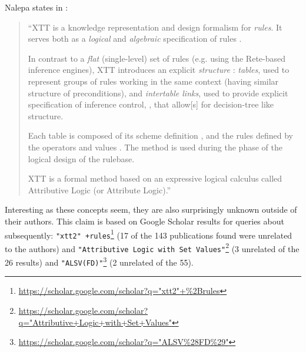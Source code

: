 Nalepa states in \cite{nalepa2008xtt2}:

\begin{quotation}
	``XTT is a knowledge representation and design formalism for \emph{rules}. It serves both as a \emph{logical} and \emph{algebraic} specification of rules \elide.
	
	In contrast to \elide a \emph{flat} (single-level) set of rules (e.g. using the Rete-based inference engines), XTT introduces an explicit \emph{structure} \elide: \emph{tables}, used to represent groups of rules working in the same context (having similar structure of preconditions), and \emph{intertable links}, used to provide explicit specification of inference control, \elide, that allow[s] for decision-tree like structure.
	
	Each table is composed of its scheme \elide definition \elide, and
	the rules defined by the operators and values \elide.
	The method is used during the phase of the logical design of the rulebase. \elide
	
	XTT is a formal method based on an expressive logical calculus called Attributive Logic (or Attribute Logic).''
\end{quotation}

Interesting as these concepts seem, they are also surprisingly unknown outside of their authors. This claim is based on Google Scholar results for queries about subsequently: \texttt{"xtt2"~+rules}\footnote{\url{https://scholar.google.com/scholar?q="xtt2"+\%2Brules}} (17 of the 143 publications found were unrelated to the authors) and \texttt{"Attributive Logic with Set Values"}\footnote{\url{https://scholar.google.com/scholar?q="Attributive+Logic+with+Set+Values"}} (3 unrelated of the 26 results) and \texttt{"ALSV(FD)"}\footnote{\url{https://scholar.google.com/scholar?q="ALSV\%28FD\%29"}} (2 unrelated of the 55).
